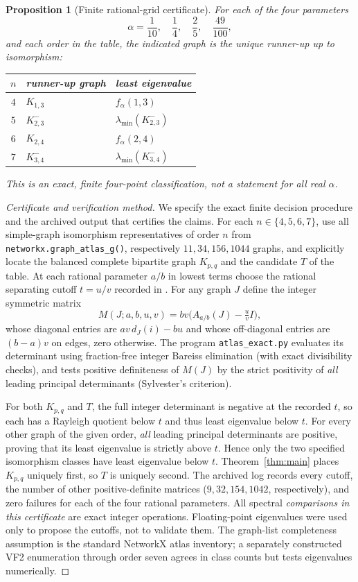 \documentclass[11pt]{amsart}
\newtheorem{proposition}[theorem]{Proposition}
\theoremstyle{definition}
\newcommand{\lam}{\lambda_{\min}}
\begin{document}
\begin{proposition}[Finite rational-grid certificate]\label{prop:finite}
For each of the four parameters
\[\alpha=\frac1{10},\quad\frac14,\quad\frac25,\quad\frac{49}{100},\]
and each order in the table, the indicated graph is the unique runner-up up to isomorphism:
\begin{center}
\begin{tabular}{c|l|l}
$n$&runner-up graph&least eigenvalue\\\hline
$4$&$K_{1,3}$&$f_\alpha(1,3)$\\
$5$&$K_{2,3}^{-}$&$\lam(K_{2,3}^{-})$\\
$6$&$K_{2,4}$&$f_\alpha(2,4)$\\
$7$&$K_{3,4}^{-}$&$\lam(K_{3,4}^{-})$
\end{tabular}
\end{center}
This is an exact, finite \emph{four-point} classification, not a statement for all real $\alpha$.
\end{proposition}
\begin{proof}[Certificate and verification method]
We specify the exact finite decision procedure and the archived output that certifies the claims. For each $n\in\{4,5,6,7\}$, use all simple-graph isomorphism representatives of order $n$ from \texttt{networkx.graph\_atlas\_g()}, respectively $11,34,156,1044$ graphs, and explicitly locate the balanced complete bipartite graph $K_{p,q}$ and the candidate $T$ of the table. At each rational parameter $a/b$ in lowest terms choose the rational separating cutoff $t=u/v$ recorded in . For any graph $J$ define the integer symmetric matrix
\[
 M(J;a,b,u,v)=bv\bigl(A_{a/b}(J)-\tfrac uv I\bigr),
\]
whose diagonal entries are $av\,d_J(i)-bu$ and whose off-diagonal entries are $(b-a)v$ on edges, zero otherwise. The program \texttt{atlas\_exact.py} evaluates its determinant using fraction-free integer Bareiss elimination (with exact divisibility checks), and tests positive definiteness of $M(J)$ by the strict positivity of \emph{all} leading principal determinants (Sylvester's criterion).

For both $K_{p,q}$ and $T$, the full integer determinant is negative at the recorded $t$, so each has a Rayleigh quotient below $t$ and thus least eigenvalue below $t$. For every other graph of the given order, \emph{all} leading principal determinants are positive, proving that its least eigenvalue is strictly above $t$. Hence only the two specified isomorphism classes have least eigenvalue below $t$. Theorem~\ref{thm:main} places $K_{p,q}$ uniquely first, so $T$ is uniquely second. The archived log records every cutoff, the number of other positive-definite matrices ($9,32,154,1042$, respectively), and zero failures for each of the four rational parameters. All spectral \emph{comparisons in this certificate} are exact integer operations. Floating-point eigenvalues were used only to propose the cutoffs, not to validate them. The graph-list completeness assumption is the standard NetworkX atlas inventory; a separately constructed VF2 enumeration through order seven agrees in class counts but tests eigenvalues numerically.
\end{proof}
\end{document}
